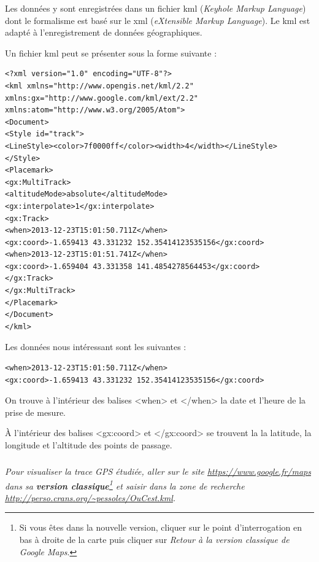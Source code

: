 \documentclass[10pt,oneside]{article}
\begin{document}
Les données y sont enregistrées dans un fichier \textsf{kml} (\textit{Keyhole Markup Language}) dont le formalisme est basé sur le \textsf{xml} (\textit{eXtensible Markup Language}). Le \textsf{kml}  est adapté à l'enregistrement de données géographiques. 

\begin{exemple}
Un fichier \textsf{kml} peut se présenter sous la forme suivante : 

\footnotesize
\begin{verbatim}
<?xml version="1.0" encoding="UTF-8"?>
<kml xmlns="http://www.opengis.net/kml/2.2"
xmlns:gx="http://www.google.com/kml/ext/2.2"
xmlns:atom="http://www.w3.org/2005/Atom">
<Document>
<Style id="track">
<LineStyle><color>7f0000ff</color><width>4</width></LineStyle>
</Style>
<Placemark>
<gx:MultiTrack>
<altitudeMode>absolute</altitudeMode>
<gx:interpolate>1</gx:interpolate>
<gx:Track>
<when>2013-12-23T15:01:50.711Z</when>
<gx:coord>-1.659413 43.331232 152.35414123535156</gx:coord>
<when>2013-12-23T15:01:51.741Z</when>
<gx:coord>-1.659404 43.331358 141.4854278564453</gx:coord>
</gx:Track>
</gx:MultiTrack>
</Placemark>
</Document>
</kml>
\end{verbatim}

\normalsize

Les données nous intéressant sont les suivantes :
\begin{verbatim}
<when>2013-12-23T15:01:50.711Z</when>
<gx:coord>-1.659413 43.331232 152.35414123535156</gx:coord>
\end{verbatim}

On trouve à l'intérieur des balises \textsf{<when>} et \textsf{</when>} la date et l'heure de la prise de mesure.

\`A l'intérieur des balises \textsf{<gx:coord>} et \textsf{</gx:coord>} se trouvent la la latitude, la longitude et l'altitude des points de passage. 


\end{exemple}



\subparagraph{}
\textit{Pour visualiser la trace GPS étudiée, aller sur le site \url{https://www.google.fr/maps} dans sa \textbf{version classique}\footnote{Si vous êtes dans la nouvelle version, cliquer sur le point d'interrogation en bas à droite de la carte puis cliquer sur \textit{Retour à la version classique de Google Maps}.} et saisir dans la zone de recherche \url{http://perso.crans.org/~pessoles/OuCest.kml}.}
\end{document}
